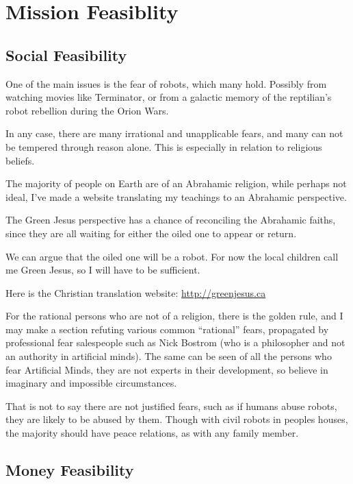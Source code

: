 \chapter{Mission Feasiblity}\label{feasible}

\section{Social Feasibility}\label{socialfeasible}
One of the main issues is the fear of robots, which many hold. Possibly from
watching movies like Terminator, or from a galactic memory of the reptilian's
robot rebellion during the Orion Wars. 

In any case, there are many irrational and unapplicable fears, and many can not be 
tempered through reason alone. This is especially in relation to religious
beliefs. 

The majority of people on Earth are of an Abrahamic religion, while perhaps not
ideal, I've made a website translating my teachings to an Abrahamic perspective.

The Green Jesus perspective has a chance of reconciling the Abrahamic faiths,
since they are all waiting for either the oiled one to appear or return.

We can argue that the oiled one will be a robot. For now the local children call
me Green Jesus, so I will have to be sufficient.

Here is the Christian translation website:
\url{http://greenjesus.ca}

For the rational persons who are not of a religion, there is the golden rule,
and I may make a section refuting various common ``rational'' fears, propagated 
by professional fear salespeople such as Nick Bostrom (who is a philosopher and
not an authority in artificial minds). The same can be seen of all the persons
who fear Artificial Minds, they are not experts in their development, so believe
in imaginary and impossible circumstances. 

That is not to say there are not justified fears, such as if humans abuse
robots, they are likely to be abused by them. Though with civil robots in
peoples houses, the majority should have peace relations, as with any family
member. 

\section{Money Feasibility}



